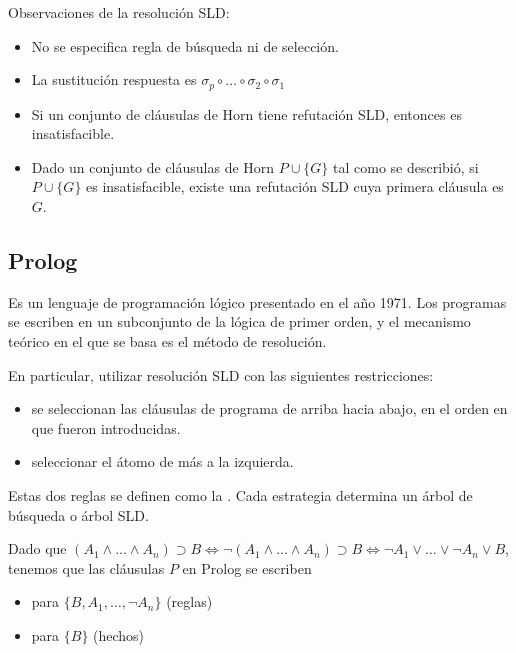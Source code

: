 Observaciones de la resolución SLD:
\begin{itemize}
  \item No se especifica regla de búsqueda ni de selección.
  \item La sustitución respuesta es $\sigma_p \circ \dots \circ \sigma_2 \circ \sigma_1$
  \item {} Si un conjunto de cláusulas de Horn tiene refutación SLD, entonces es insatisfacible.
  \item {} Dado un conjunto de cláusulas de Horn $P \cup \{G\}$ tal como se describió, si $P \cup \{G\}$ es insatisfacible, existe una refutación SLD cuya primera cláusula es $G$.
\end{itemize}

\subsection{Prolog}

Es un lenguaje de programación lógico presentado en el año 1971. Los programas se escriben en un subconjunto de la lógica de primer orden, y el mecanismo teórico en el que se basa es el método de resolución.

En particular, utilizar resolución SLD con las siguientes restricciones:
\begin{itemize}
  \item {} se seleccionan las cláusulas de programa de arriba hacia abajo, en el orden en que fueron introducidas.
  \item {} seleccionar el átomo de más a la izquierda.
\end{itemize}

Estas dos reglas se definen como la . Cada estrategia determina un árbol de búsqueda o árbol SLD.

Dado que $(A_1 \land \dots \land A_n) \supset B \iff \lnot (A_1 \land \dots \land A_n) \supset B \iff \lnot A_1 \lor \dots \lor \lnot A_n \lor B$, tenemos que las cláusulas $P$ en Prolog se escriben
\begin{itemize}
  \item {} para $\{B, A_1, \dots, \lnot A_n\}$ (reglas)
  \item {} para $\{B\}$ (hechos)
\end{itemize}

